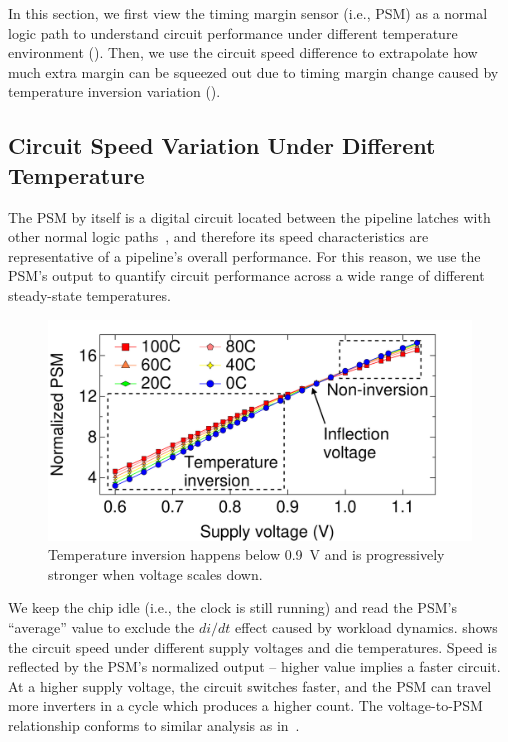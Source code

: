 In this section, we first view the timing margin sensor (i.e., PSM) as a normal logic path to understand circuit performance under different temperature environment (). Then, we use the circuit speed difference to extrapolate how much extra margin can be squeezed out due to timing margin change caused by temperature inversion variation ().

\subsection{Circuit Speed Variation Under Different Temperature}
\label{sec:temperature:characterize:psm}

The PSM by itself is a digital circuit located between the pipeline latches with other normal logic paths~\cite{sriram2016avfs}, and therefore its speed characteristics are representative of a pipeline's overall performance. For this reason, we use the PSM's output to quantify circuit performance across a wide range of different steady-state temperatures. 

\begin{figure}
\centering
    \includegraphics[trim=0 0 50 20,clip,width=.9\linewidth]{graphs/temperature/idle-psm-volt-temp.pdf}
    \caption{Temperature inversion happens below 0.9~V and is progressively stronger when voltage scales down.}
    \label{fig:psm-wide-range}
\end{figure}

We keep the chip idle (i.e., the clock is still running) and read the PSM's ``average'' value to exclude the $di/dt$ effect caused by workload dynamics.  shows the circuit speed under different supply voltages and die temperatures. Speed is reflected by the PSM's normalized output -- higher value implies a faster circuit. At a higher supply voltage, the circuit switches faster, and the PSM can travel more inverters in a cycle which produces a higher count. The voltage-to-PSM relationship conforms to similar analysis as in~\cite{zu2015adaptive}.

